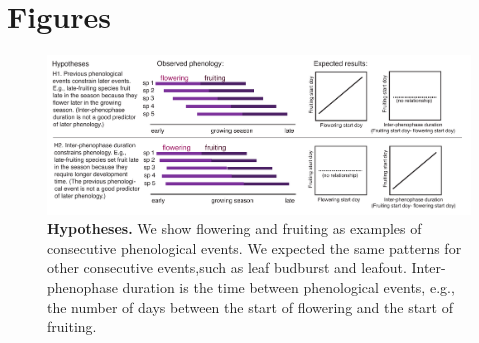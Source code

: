 \documentclass{article}
\begin{document}
\section* {Figures}
\begin{figure}[p]
  \centering
  \includegraphics{../analyses/figures/hypotheses3.pdf} 
  \caption{\textbf{Hypotheses.} We show flowering and fruiting as examples of consecutive phenological events. We expected the same patterns for other consecutive events,such as leaf budburst and leafout. Inter-phenophase duration is the time between phenological events, e.g., the number of days between the start of flowering and the start of fruiting.} 
 \label{fig:hyp}
\end{figure}
 
\end{document}
